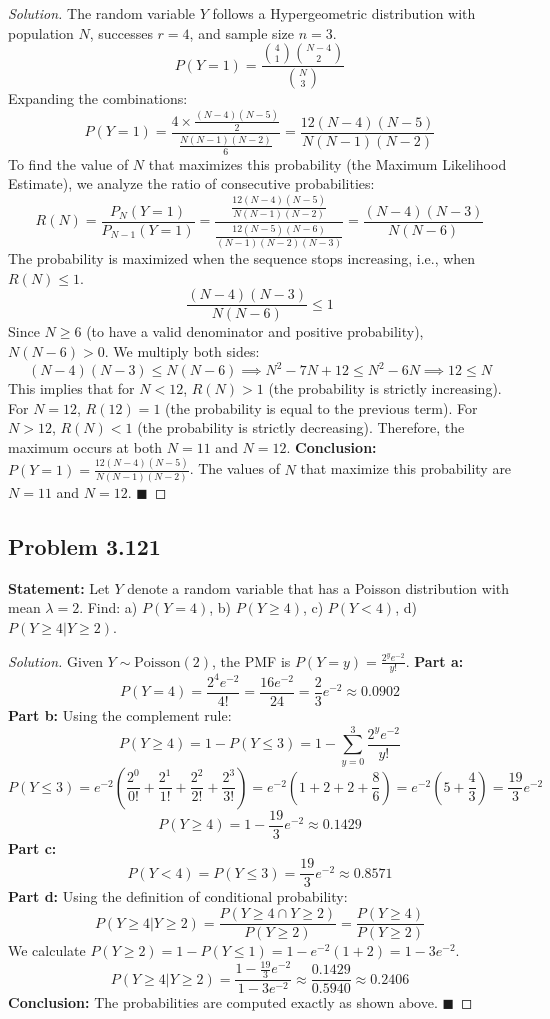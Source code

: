 \documentclass[11pt]{article}
\theoremstyle{definition}
\theoremstyle{remark}
\begin{document}
\begin{proof}[Solution]
The random variable $Y$ follows a Hypergeometric distribution with population $N$, successes $r=4$, and sample size $n=3$.
\[ P(Y = 1) = \frac{\binom{4}{1}\binom{N-4}{2}}{\binom{N}{3}} \]
Expanding the combinations:
\[ P(Y = 1) = \frac{4 \times \frac{(N-4)(N-5)}{2}}{\frac{N(N-1)(N-2)}{6}} = \frac{12(N-4)(N-5)}{N(N-1)(N-2)} \]
To find the value of $N$ that maximizes this probability (the Maximum Likelihood Estimate), we analyze the ratio of consecutive probabilities:
\[ R(N) = \frac{P_{N}(Y=1)}{P_{N-1}(Y=1)} = \frac{\frac{12(N-4)(N-5)}{N(N-1)(N-2)}}{\frac{12(N-5)(N-6)}{(N-1)(N-2)(N-3)}} = \frac{(N-4)(N-3)}{N(N-6)} \]
The probability is maximized when the sequence stops increasing, i.e., when $R(N) \le 1$.
\[ \frac{(N-4)(N-3)}{N(N-6)} \le 1 \]
Since $N \ge 6$ (to have a valid denominator and positive probability), $N(N-6) > 0$. We multiply both sides:
\[ (N-4)(N-3) \le N(N-6) \implies N^2 - 7N + 12 \le N^2 - 6N \implies 12 \le N \]
This implies that for $N < 12$, $R(N) > 1$ (the probability is strictly increasing). For $N = 12$, $R(12) = 1$ (the probability is equal to the previous term). For $N > 12$, $R(N) < 1$ (the probability is strictly decreasing).
Therefore, the maximum occurs at both $N = 11$ and $N = 12$.
\textbf{Conclusion:} $P(Y=1) = \frac{12(N-4)(N-5)}{N(N-1)(N-2)}$. The values of $N$ that maximize this probability are $N=11$ and $N=12$. $\blacksquare$
\end{proof}

\subsection*{Problem 3.121}
\textbf{Statement:} Let $Y$ denote a random variable that has a Poisson distribution with mean $\lambda = 2$. Find: a) $P(Y=4)$, b) $P(Y \ge 4)$, c) $P(Y < 4)$, d) $P(Y \ge 4 | Y \ge 2)$.

\begin{proof}[Solution]
Given $Y \sim \text{Poisson}(2)$, the PMF is $P(Y=y) = \frac{2^y e^{-2}}{y!}$.
\textbf{Part a:}
\[ P(Y=4) = \frac{2^4 e^{-2}}{4!} = \frac{16 e^{-2}}{24} = \frac{2}{3}e^{-2} \approx 0.0902 \]
\textbf{Part b:}
Using the complement rule:
\[ P(Y \ge 4) = 1 - P(Y \le 3) = 1 - \sum_{y=0}^{3} \frac{2^y e^{-2}}{y!} \]
\[ P(Y \le 3) = e^{-2} \left( \frac{2^0}{0!} + \frac{2^1}{1!} + \frac{2^2}{2!} + \frac{2^3}{3!} \right) = e^{-2} \left( 1 + 2 + 2 + \frac{8}{6} \right) = e^{-2} \left( 5 + \frac{4}{3} \right) = \frac{19}{3}e^{-2} \]
\[ P(Y \ge 4) = 1 - \frac{19}{3}e^{-2} \approx 0.1429 \]
\textbf{Part c:}
\[ P(Y < 4) = P(Y \le 3) = \frac{19}{3}e^{-2} \approx 0.8571 \]
\textbf{Part d:}
Using the definition of conditional probability:
\[ P(Y \ge 4 | Y \ge 2) = \frac{P(Y \ge 4 \cap Y \ge 2)}{P(Y \ge 2)} = \frac{P(Y \ge 4)}{P(Y \ge 2)} \]
We calculate $P(Y \ge 2) = 1 - P(Y \le 1) = 1 - e^{-2}(1 + 2) = 1 - 3e^{-2}$.
\[ P(Y \ge 4 | Y \ge 2) = \frac{1 - \frac{19}{3}e^{-2}}{1 - 3e^{-2}} \approx \frac{0.1429}{0.5940} \approx 0.2406 \]
\textbf{Conclusion:} The probabilities are computed exactly as shown above. $\blacksquare$
\end{proof}
\end{document}
